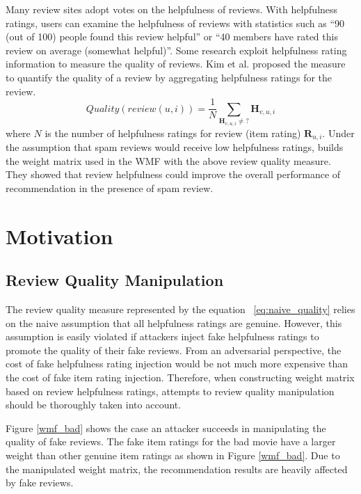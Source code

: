 \documentclass[master,english,final]{kaist-ucs}
\begin{document}
Many review sites adopt votes on the helpfulness of reviews.
With helpfulness ratings, users can examine the helpfulness of reviews with statistics such as “90 (out of 100) people found this review helpful” or “40 members have rated this review on average (somewhat helpful)”.
Some research \cite{naive_helpfulness,RQMF} exploit helpfulness rating information to measure the quality of reviews.
Kim et al. \cite{naive_helpfulness} proposed the measure to quantify the quality of a review by aggregating helpfulness ratings for the review.
\begin{equation} \label{eq:naive_quality}
Quality(review(u,i))=\frac{1} {N} \sum_{\bm{H}_{v,u,i} \neq ?} \bm{H}_{v,u,i}
\end{equation}
where $N$ is the number of helpfulness ratings for review (item rating) $\bm{R}_{u,i}$.
Under the assumption that spam reviews would receive low helpfulness ratings, \cite{RQMF} builds the weight matrix used in the WMF with the above review quality measure.
They showed that review helpfulness could improve the overall performance of recommendation in the presence of spam review.

\chapter{Motivation}
\section{Review Quality Manipulation}
The review quality measure represented by the equation ~\ref{eq:naive_quality} relies on the naive assumption that all helpfulness ratings are genuine.
However, this assumption is easily violated if attackers inject fake helpfulness ratings to promote the quality of their fake reviews.
From an adversarial perspective, the cost of fake helpfulness rating injection would be not much more expensive than the cost of fake item rating injection.
Therefore, when constructing weight matrix based on review helpfulness ratings, attempts to review quality manipulation should be thoroughly taken into account.

Figure \ref{wmf_bad} shows the case an attacker succeeds in manipulating the quality of fake reviews.
The fake item ratings for the bad movie have a larger weight than other genuine item ratings as shown in Figure \ref{wmf_bad}.
Due to the manipulated weight matrix, the recommendation results are heavily affected by fake reviews.
\end{document}
